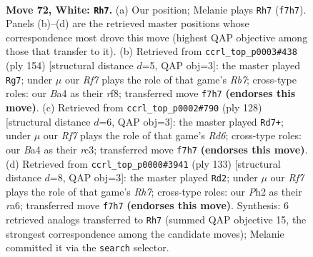 \documentclass[11pt]{article}
\begin{document}
\clearpage

\begin{figure}[p]\centering
\begin{subfigure}{0.46\textwidth}\centering
\resizebox{\linewidth}{!}{%
\newchessgame
\chessboard[
  setfen={8/5R2/1k3P2/8/B7/8/5K1P/8 w - - 1 72},
  showmover=false,
  pgfstyle=straightmove, color=movearrow, markmove={f7-h7}
]}
\caption{}
\end{subfigure}\hfill
\begin{subfigure}{0.46\textwidth}\centering
\resizebox{\linewidth}{!}{%
\newchessgame
\chessboard[
  setfen={5r2/1R6/1P1k4/8/4K3/6p1/8/8 w - - 0 78},
  showmover=false,
  pgfstyle=straightmove, color=movearrow, markmove={b7-g7}
]}
\caption{}
\end{subfigure}
\\[4pt]
\begin{subfigure}{0.46\textwidth}\centering
\resizebox{\linewidth}{!}{%
\newchessgame
\chessboard[
  setfen={8/5k2/3R4/1K1Pp3/8/2r5/8/8 w - - 1 65},
  showmover=false,
  pgfstyle=straightmove, color=movearrow, markmove={d6-d7}
]}
\caption{}
\end{subfigure}\hfill
\begin{subfigure}{0.46\textwidth}\centering
\resizebox{\linewidth}{!}{%
\newchessgame
\chessboard[
  setfen={8/6k1/R7/8/8/5B1p/7r/5K2 b - - 1 67},
  showmover=false,
  pgfstyle=straightmove, color=movearrow, markmove={h2-d2}
]}
\caption{}
\end{subfigure}
\caption{\textbf{Move 72, White: \texttt{Rh7}.} (a) Our position; Melanie plays \texttt{Rh7} (\texttt{f7h7}). Panels (b)--(d) are the retrieved master positions whose correspondence most drove this move (highest QAP objective among those that transfer to it). (b) Retrieved from \texttt{ccrl\_top\_p0003\#438} (ply 154) [structural distance $d$=5, QAP obj=3]: the master played \texttt{Rg7}; under $\mu$ our \emph{Rf7} plays the role of that game's \emph{Rb7}; cross-type roles: our \emph{B}a4 as their \emph{r}f8; transferred move \texttt{f7h7} \textbf{(endorses this move)}. (c) Retrieved from \texttt{ccrl\_top\_p0002\#790} (ply 128) [structural distance $d$=6, QAP obj=3]: the master played \texttt{Rd7+}; under $\mu$ our \emph{Rf7} plays the role of that game's \emph{Rd6}; cross-type roles: our \emph{B}a4 as their \emph{r}c3; transferred move \texttt{f7h7} \textbf{(endorses this move)}. (d) Retrieved from \texttt{ccrl\_top\_p0000\#3941} (ply 133) [structural distance $d$=8, QAP obj=3]: the master played \texttt{Rd2}; under $\mu$ our \emph{Rf7} plays the role of that game's \emph{Rh7}; cross-type roles: our \emph{P}h2 as their \emph{r}a6; transferred move \texttt{f7h7} \textbf{(endorses this move)}. Synthesis: 6 retrieved analogs transferred to \texttt{Rh7} (summed QAP objective 15, the strongest correspondence among the candidate moves); Melanie committed it via the \texttt{search} selector.}
\label{fig:thought-m142}
\end{figure}
\end{document}
